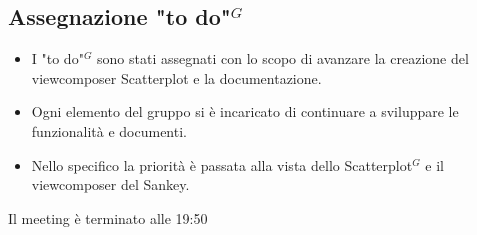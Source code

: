 \subsection{Assegnazione "to do"$^{G}$}
\begin{itemize}
	\item I "to do"$^{G}$ sono stati assegnati con lo scopo di avanzare la creazione del viewcomposer Scatterplot e la documentazione.
	\item Ogni elemento del gruppo si è incaricato di continuare a sviluppare le funzionalità e documenti.
	\item Nello specifico la priorità è passata alla vista dello Scatterplot$^{G}$ e il viewcomposer del Sankey.
\end{itemize}

Il meeting è terminato alle 19:50

